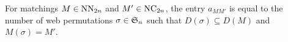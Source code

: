 \begin{thm}
  \label{thm:main_intro}
  For matchings \( M\in\operatorname{NN}_{2n} \) and \( M'\in\operatorname{NC}_{2n} \),
  the entry \( a_{MM'} \) is equal to the number of web permutations
  \( \sigma\in\mathfrak{S}_n \) such that \( D(\sigma)\subseteq D(M) \) and \(M(\sigma)=M'\).
\end{thm}


